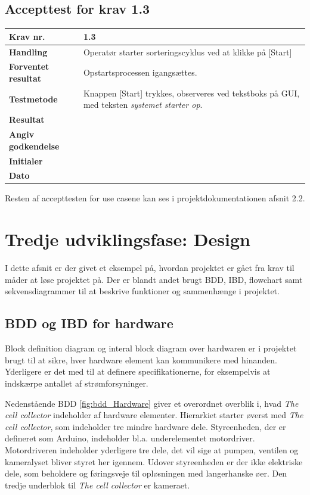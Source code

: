 \subsection{Accepttest for krav 1.3}
	\begin{center}
		\begin{longtable}{ | m{4cm}| m{8.5cm}|} 
			\hline
			\textbf{Krav nr.} & 1.3    \\ 
			\hline
			\textbf{Handling} &  Operatør starter sorteringscyklus ved at klikke på [Start]  \\
			\hline
			\textbf{Forventet resultat} &  Opstartsprocessen igangsættes.  \\
			\hline
			\textbf{Testmetode}  & Knappen [Start] trykkes, observeres ved tekstboks på GUI, med teksten \textit{systemet starter op}.   \\
			\hline
			\textbf{Resultat}  &    \\
			\hline
			\textbf{Angiv godkendelse} &     \\
			\hline
			\textbf{Initialer} &     \\
			\hline
			\textbf{Dato} &    \\
			\hline
		\end{longtable}
	\end{center}
	
Resten af accepttesten for use casene kan ses i projektdokumentationen afsnit 2.2.

\section{Tredje udviklingsfase: Design}
\label{subsec:design}
I dette afsnit er der givet et eksempel på, hvordan projektet er gået fra krav til måder at løse projektet på. Der er blandt andet brugt BDD, IBD, flowchart samt sekvensdiagrammer til at beskrive funktioner og sammenhænge i projektet. 

\subsection{BDD og IBD for hardware}
Block definition diagram og interal block diagram over hardwaren er i projektet brugt til at sikre, hver hardware element kan kommunikere med hinanden. Yderligere er det med til at definere specifikationerne, for eksempelvis at indskærpe antallet af strømforsyninger.

Nedenstående BDD \ref{fig:bdd_Hardware} giver et overordnet overblik i, hvad \textit{The cell collector} indeholder af hardware elementer. Hierarkiet starter øverst med \textit{The cell collector}, som indeholder tre mindre hardware dele. Styreenheden, der er defineret som Arduino, indeholder bl.a. underelementet motordriver. Motordriveren indeholder yderligere tre dele,  det vil sige at pumpen, ventilen og kameralyset bliver styret her igennem. Udover styreenheden er der ikke elektriske dele, som beholdere og føringsveje til opløsningen med langerhanske øer. Den tredje underblok til \textit{The cell collector} er kameraet.

